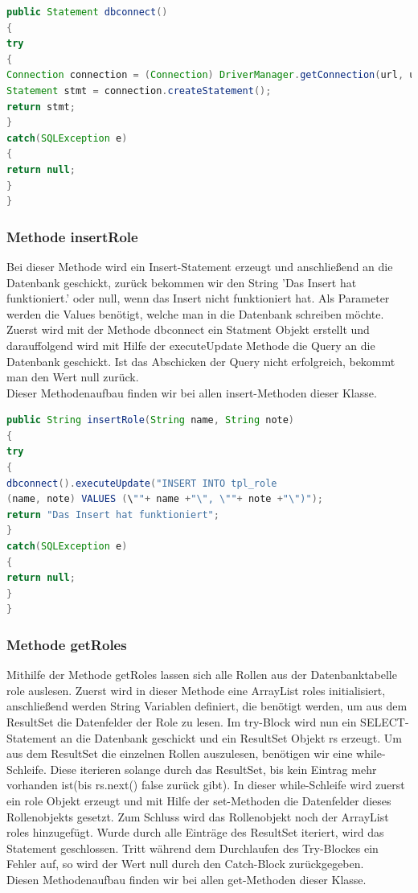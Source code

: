 \begin{lstlisting}[language=JAVA, caption=Datenbankanbindung.java/Methode-dbconnect, firstnumber=44]
public Statement dbconnect()
{   
try
{
Connection connection = (Connection) DriverManager.getConnection(url, username, password);
Statement stmt = connection.createStatement();
return stmt;
}
catch(SQLException e)
{
return null;
}
}
\end{lstlisting}

\newpage

\subsubsection{Methode insertRole\(\)}

Bei dieser Methode wird ein Insert-Statement erzeugt und anschließend an die Datenbank geschickt, zurück bekommen wir den String 'Das Insert hat funktioniert.' oder null, wenn das Insert nicht funktioniert hat. Als Parameter werden die Values benötigt, welche man in die Datenbank schreiben möchte. Zuerst wird mit der Methode dbconnect\(\) ein Statment Objekt erstellt und darauffolgend wird mit Hilfe der executeUpdate Methode die Query an die Datenbank geschickt. Ist das Abschicken der Query nicht erfolgreich, bekommt man den Wert null zurück.\\
Dieser Methodenaufbau finden wir bei allen insert-Methoden dieser Klasse.

\begin{lstlisting}[language=JAVA, caption=Datenbankanbindung.java/Methode-dbconnect, firstnumber=271]
public String insertRole(String name, String note)
{
try
{
dbconnect().executeUpdate("INSERT INTO tpl_role 
(name, note) VALUES (\""+ name +"\", \""+ note +"\")");
return "Das Insert hat funktioniert";
}
catch(SQLException e)
{
return null;
}
}
\end{lstlisting}
\newpage
\subsubsection{Methode getRoles\(\)}

Mithilfe der Methode getRoles lassen sich alle Rollen aus der Datenbanktabelle role auslesen.
Zuerst wird in dieser Methode eine ArrayList roles initialisiert, anschließend werden String Variablen definiert, die benötigt werden, um aus dem ResultSet die Datenfelder der Role zu lesen.
Im try-Block wird nun ein SELECT-Statement an die Datenbank geschickt und ein ResultSet Objekt rs erzeugt. 
Um aus dem ResultSet die einzelnen Rollen auszulesen, benötigen wir eine while-Schleife. Diese iterieren solange durch das ResultSet, bis kein Eintrag mehr vorhanden ist(bis rs.next() false zurück gibt).
In dieser while-Schleife wird zuerst ein role Objekt erzeugt und mit Hilfe der set-Methoden die Datenfelder dieses Rollenobjekts gesetzt. Zum Schluss wird das Rollenobjekt noch der ArrayList roles hinzugefügt. Wurde durch alle Einträge des ResultSet iteriert, wird das Statement geschlossen. Tritt während dem Durchlaufen des Try-Blockes ein Fehler auf, so wird der Wert null durch den Catch-Block zurückgegeben.\\ 
Diesen Methodenaufbau finden wir bei allen get-Methoden dieser Klasse.

